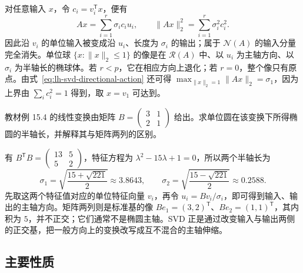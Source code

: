 对任意输入 $x$，令 $c_i=v_i^{\mathsf T}x$，便有
\begin{equation}
Ax=\sum_{i=1}^r\sigma_i c_i u_i,\qquad
\|Ax\|_2^2=\sum_{i=1}^r\sigma_i^2c_i^2.
\label{eq:lh-svd-directional-action}
\end{equation}
因此沿 $v_i$ 的单位输入被变成沿 $u_i$、长度为 $\sigma_i$ 的输出；属于 $\mathcal N(A)$ 的输入分量完全消失。单位球 $\{x:\|x\|_2\leq1\}$ 的像是在 $\mathcal R(A)$ 中、以 $u_i$ 为主轴方向、以 $\sigma_i$ 为半轴长的椭球体。若 $r<p$，它在相应方向上退化；若 $r=0$，整个像只有原点。由式~\eqref{eq:lh-svd-directional-action} 还可得 $\max_{\|x\|_2=1}\|Ax\|_2=\sigma_1$，因为上界由 $\sum_i c_i^2=1$ 得到，取 $x=v_1$ 可达到。

\begin{example}
\label{ex:lh-svd-geometric-two-by-two}
教材例 15.4 的线性变换由矩阵 $B=\begin{pmatrix}3&1\\2&1\end{pmatrix}$ 给出。求单位圆在该变换下所得椭圆的半轴长，并解释其与矩阵两列的区别。
\end{example}
\begin{solve}
有 $B^{\mathsf T}B=\begin{pmatrix}13&5\\5&2\end{pmatrix}$，特征方程为 $\lambda^2-15\lambda+1=0$，所以两个半轴长为
\[
\sigma_1=\sqrt{\frac{15+\sqrt{221}}2}\approx3.8643,\qquad
\sigma_2=\sqrt{\frac{15-\sqrt{221}}2}\approx0.2588.
\]
先取这两个特征值对应的单位特征向量 $v_i$，再令 $u_i=Bv_i/\sigma_i$，即可得到输入、输出的主轴方向。矩阵两列则是标准基的像 $Be_1=(3,2)^{\mathsf T}$、$Be_2=(1,1)^{\mathsf T}$，其内积为 $5$，并不正交；它们通常不是椭圆主轴。SVD 正是通过改变输入与输出两侧的正交基，把一般方向上的变换改写成互不混合的主轴伸缩。
\end{solve}

\subsection{主要性质}
\label{subsec:lh-svd-properties}

